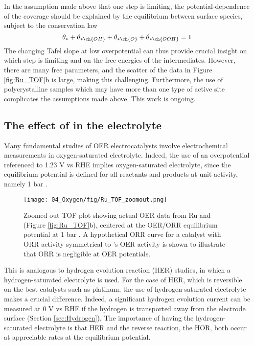 In the assumption made above that one step is limiting, the potential-dependence of the coverage should be explained by the equilibrium between surface species, subject to the conservation law
\begin{equation}
 \theta_{*} + \theta_{* \ch{OH}} + \theta_{* \ch{O}} + \theta_{* \ch{OOH}} = 1
\end{equation}
The changing Tafel slope at low overpotential can thus provide crucial insight on which step is limiting and on the free energies of the intermediates. However, there are many free parameters, and the scatter of the data in Figure \ref{fig:Ru_TOF}b is large, making this challenging. Furthermore, the use of polycrystalline samples which may have more than one type of active site complicates the assumptions made above. This work is ongoing.


\subsection{The effect of  in the electrolyte}

Many fundamental studies of OER electrocatalysts involve electrochemical measurements in oxygen-saturated electrolyte. Indeed, the use of an overpotential referenced to 1.23 V vs RHE implies oxygen-saturated electrolyte, since the equilibrium potential is defined for all reactants and products at unit activity, namely 1 bar . 

\begin{figure}[h!]
	\centering
	\texttt{[image: 04\_Oxygen/fig/Ru\_TOF\_zoomout.png]}
	\caption{Zoomed out TOF plot showing actual OER data from Ru and  (Figure \ref{fig:Ru_TOF}b), centered at the OER/ORR equilibrium potential at 1 bar . A hypothetical ORR curve for a catalyst with ORR activity symmetrical to 's OER activity is shown to illustrate that ORR is negligible at OER potentials.}
	\label{fig:Ru_TOF_zoomout}
\end{figure}

This is analogous to hydrogen evolution reaction (HER) studies, in which a hydrogen-saturated electrolyte is used. For the case of HER, which is reversible on the best catalysts such as platinum, the use of hydrogen-saturated electrolyte makes a crucial difference. Indeed, a significant hydrogen evolution current can be measured at 0 V vs RHE if the hydrogen is transported away from the electrode surface (Section \ref{sec:Hydrogen}). The importance of having the hydrogen-saturated electrolyte is that HER and the reverse reaction, the HOR, both occur at appreciable rates at the equilibrium potential.

